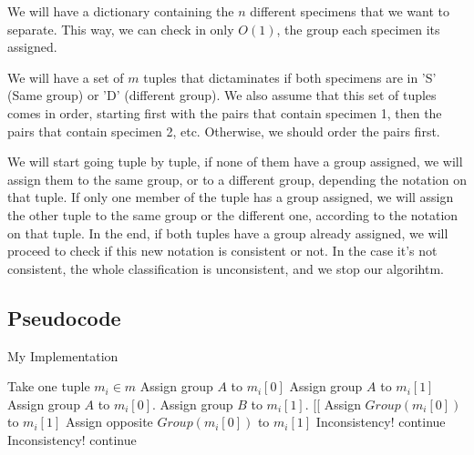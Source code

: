 \documentclass{article}
\begin{document}
We will have a dictionary containing the $n$ different specimens that we want to separate. This way, we can check in only $O(1)$, the group each specimen its assigned.

We will have a set of $m$ tuples that dictaminates if both specimens are in 'S' (Same group) or 'D' (different group). We also assume that this set of tuples comes in order, starting first with the pairs that contain specimen 1, then the pairs that contain specimen 2, etc. Otherwise, we should order the pairs first.

We will start going tuple by tuple, if none of them have a group assigned, we will assign them to the same group, or to a different group, depending the notation on that tuple. If only one member of the tuple has a group assigned, we will assign the other tuple to the same group or the different one, according to the notation on that tuple. In the end, if both tuples have a group already assigned, we will proceed to check if this new notation is consistent or not. In the case it's not consistent, the whole classification is unconsistent, and we stop our algorihtm.

\subsection*{Pseudocode}

\begin{algorithm}[H]
\caption{My Implementation}
\begin{algorithmic}[1]
 \State Take one tuple $m_i \in m$
   \State Assign group $A$ to $m_i[0]$
   \State Assign group $A$ to $m_i[1]$
   \State Assign group $A$ to $m_i[0]$.
   \State Assign group $B$ to $m_i[1]$.
  \EndIf
 \EndIf
 [[
   \State Assign $Group(m_i[0])$ to $m_i[1]$
   \State Assign opposite $Group(m_i[0])$ to $m_i[1]$
  \EndIf
 \EndIf
    \State Inconsistency!
   \Else
    \State continue
   \EndIf
    \State Inconsistency!
   \Else
    \State continue
   \EndIf
  \EndIf
 \EndIf
\EndWhile
\end{algorithmic}
\end{algorithm}
\end{document}
